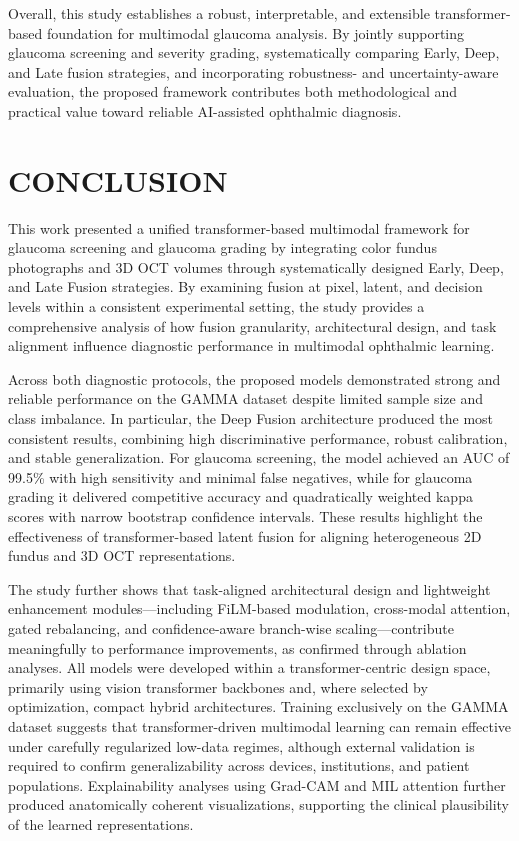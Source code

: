 \documentclass[preprint,12pt]{elsarticle}
\begin{document}
Overall, this study establishes a robust, interpretable, and extensible transformer-based foundation for multimodal glaucoma analysis. By jointly supporting glaucoma screening and severity grading, systematically comparing Early, Deep, and Late fusion strategies, and incorporating robustness- and uncertainty-aware evaluation, the proposed framework contributes both methodological and practical value toward reliable AI-assisted ophthalmic diagnosis.

\section{CONCLUSION}

This work presented a unified transformer-based multimodal framework for glaucoma screening and glaucoma grading by integrating color fundus photographs and 3D OCT volumes through systematically designed Early, Deep, and Late Fusion strategies. By examining fusion at pixel, latent, and decision levels within a consistent experimental setting, the study provides a comprehensive analysis of how fusion granularity, architectural design, and task alignment influence diagnostic performance in multimodal ophthalmic learning.

Across both diagnostic protocols, the proposed models demonstrated strong and reliable performance on the GAMMA dataset despite limited sample size and class imbalance. In particular, the Deep Fusion architecture produced the most consistent results, combining high discriminative performance, robust calibration, and stable generalization. For glaucoma screening, the model achieved an AUC of 99.5\% with high sensitivity and minimal false negatives, while for glaucoma grading it delivered competitive accuracy and quadratically weighted kappa scores with narrow bootstrap confidence intervals. These results highlight the effectiveness of transformer-based latent fusion for aligning heterogeneous 2D fundus and 3D OCT representations.

The study further shows that task-aligned architectural design and lightweight enhancement modules—including FiLM-based modulation, cross-modal attention, gated rebalancing, and confidence-aware branch-wise scaling—contribute meaningfully to performance improvements, as confirmed through ablation analyses. All models were developed within a transformer-centric design space, primarily using vision transformer backbones and, where selected by optimization, compact hybrid architectures. Training exclusively on the GAMMA dataset suggests that transformer-driven multimodal learning can remain effective under carefully regularized low-data regimes, although external validation is required to confirm generalizability across devices, institutions, and patient populations. Explainability analyses using Grad-CAM and MIL attention further produced anatomically coherent visualizations, supporting the clinical plausibility of the learned representations.
\end{document}

